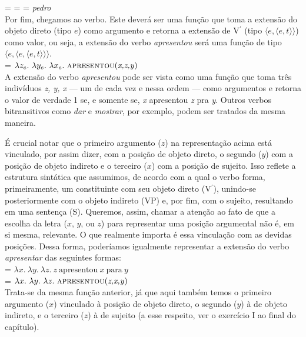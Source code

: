 \noindent {} =  =  = \textit{pedro}\\

\noindent Por fim, chegamos ao verbo. Este deverá ser uma função
que toma a extensão do objeto direto (tipo $e$) como argumento e
retorna a extensão de V$^{\prime}$ (tipo
$\langle e,\langle e,t \rangle\rangle$) como valor, ou seja, a extensão do
verbo \textit{apresentou} será uma função de tipo
$\langle e,\langle e,\langle e,t \rangle\rangle\rangle$.\\

\noindent {} = $\lambda z_{e}.\ \lambda y_{e}.\
\lambda x_{e}.\ \text{\textsc{apresentou}(\textit{x,z,y})}$\\

\noindent A extensão do verbo \textit{apresentou} pode ser vista como uma função que toma três
indivíduos \textit{z, y, x} --- um de cada vez e nessa ordem --- como argumentos e retorna o valor de
verdade 1 se, e somente se, \textit{x} apresentou \textit{z} pra
\textit{y}. Outros verbos bitransitivos como \textit{dar} e \textit{mostrar}, por
exemplo, podem ser tratados da mesma maneira.

É crucial notar que o primeiro argumento ($z$) na representação acima está vinculado, por assim dizer, com a posição de objeto direto, o segundo ($y$) com a posição de objeto indireto e o terceiro ($x$) com a posição de sujeito. Isso reflete a estrutura sintática que assumimos, de acordo com a qual o verbo forma, primeiramente, um constituinte com seu objeto direto (V$^{\prime}$), unindo-se posteriormente com o objeto indireto (VP) e, por fim, com o sujeito, resultando em uma sentença (S). Queremos, assim, chamar a atenção ao fato de que a escolha da letra ($x$, $y$, ou $z$) para representar uma posição argumental não é, em si mesma, relevante. O que realmente importa é essa vinculação com as devidas posições. Dessa forma, poderíamos igualmente representar a extensão do verbo \textit{apresentar} das seguintes formas:\\

\n {} = $\lambda x.\ \lambda y.\
\lambda z.\ z\ \text{apresentou}\ x\ \text{para}\ y$\\

\n \den{apresentou} = $\lambda x.\ \lambda y.\
\lambda z.\ \text{\textsc{apresentou}(\textit{z,x,y})}$\\

\n Trata-se da mesma função anterior, já que aqui também temos o primeiro argumento ($x$) vinculado à posição de objeto direto, o segundo ($y$) à de objeto indireto, e o terceiro ($z$) à de sujeito (a esse respeito, ver o exercício I ao final do capítulo).

